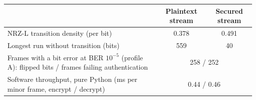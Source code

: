 \begin{table}[htbp]
  \vspace{4pt}
  \begin{tabular}{@{}lcc@{}}
    \toprule
     & Plaintext stream & Secured stream \\
    \midrule
    NRZ-L transition density (per bit) & 0.378 & 0.491 \\
    Longest run without transition (bits) & 559 & 40 \\
    Frames with a bit error at BER $10^{-5}$ (profile A): flipped bits / frames failing authentication & \multicolumn{2}{c}{258 / 252} \\
    Software throughput, pure Python (ms per minor frame, encrypt / decrypt) & \multicolumn{2}{c}{0.44 / 0.46} \\
    \bottomrule
  \end{tabular}
\end{table}
